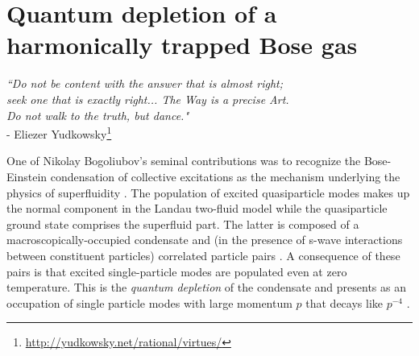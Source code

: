 \chapter{Quantum depletion of a harmonically trapped Bose gas}
\label{chap:QD}




\begin{adjustwidth}{2cm}{0cm}
\begin{flushright}
\singlespacing
\emph{``Do not be content with the answer that is almost right; \\
	seek one that is exactly right... The Way is a precise Art.\\
	Do not walk to the truth, but dance."} 
	\\- Eliezer Yudkowsky\footnote{\url{http://yudkowsky.net/rational/virtues/}}
\end{flushright}
\end{adjustwidth}
\onehalfspacing
\vspace{1cm}




	{One} of Nikolay Bogoliubov's seminal contributions was to recognize the Bose-Einstein condensation of collective excitations as the mechanism underlying the physics of superfluidity \cite{Bogoliubov47}.
	The population of excited quasiparticle modes makes up the normal component in the Landau two-fluid model while the %
	quasiparticle ground state comprises the superfluid part. {The latter is composed of a macroscopically-occupied condensate and (in the presence of s-wave interactions between constituent particles) correlated particle pairs \cite{Bogoliubov47,Vogels02}}.
	{A consequence of these pairs is  that excited} single-particle modes are populated even at zero temperature.
	This is the \emph{quantum depletion} of the condensate and presents as an occupation of single particle modes with large momentum $p$ that decays like $p^{-4}$ \cite{PitaevskiiStringari,Decamp18}.

